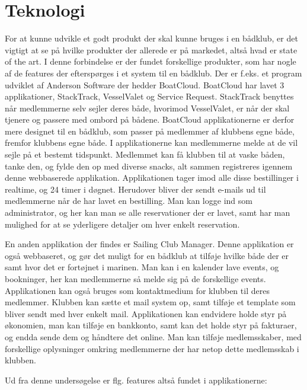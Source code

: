 \chapter{Teknologi}\label{chap:teknologi-analyse}

\cbstart

For at kunne udvikle et godt produkt der skal kunne bruges i en bådklub, er det vigtigt at se på hvilke
produkter der allerede er på markedet, altså hvad er state of the art. I denne forbindelse er der fundet
forskellige produkter, som har nogle af de features der efterspørges i et system til en bådklub. Der er f.eks.
et program udviklet af Anderson Software der hedder BoatCloud.\citep{BoatCloud} BoatCloud har lavet 3
applikationer, StackTrack, VesselValet og Service Request. StackTrack benyttes når medlemmerne selv sejler
deres både, hvorimod VesselValet, er når der skal tjenere og passere med ombord på bådene. BoatCloud
applikationerne er derfor mere designet til en bådklub, som passer på medlemmer af klubbens egne både, fremfor
klubbens egne både. I applikationerne kan medlemmerne melde at de vil sejle på et bestemt tidspunkt. Medlemmet
kan få klubben til at vaske båden, tanke den, og fylde den op med diverse snacks, alt sammen registreres
igennem denne webbaserede applikation. Applikationen tager imod alle disse bestillinger i realtime, og 24
timer i døgnet. Herudover bliver der sendt e-mails ud til medlemmerne når de har lavet en bestilling. Man kan
logge ind som administrator, og her kan man se alle reservationer der er lavet, samt har man mulighed for at
se yderligere detaljer om hver enkelt reservation.

En anden applikation der findes er Sailing Club Manager. \citep{SailClub} Denne applikation er også
webbaseret, og gør det muligt for en bådklub at tilføje hvilke både der er samt hvor det er fortøjnet i
marinen. Man kan i en kalender lave events, og bookninger, her kan medlemmerne så melde sig på de forskellige
events. Applikationen kan også bruges som kontaktmedium for klubben til deres medlemmer. Klubben kan sætte et
mail system op, samt tilføje et template som bliver sendt med hver enkelt mail. Applikationen kan endvidere
holde styr på økonomien, man kan tilføje en bankkonto, samt kan det holde styr på fakturaer, og endda sende
dem og håndtere det online. Man kan tilføje medlemsskaber, med forskellige oplysninger omkring medlemmerne der
har netop dette medlemsskab i klubben.

Ud fra denne undersøgelse er flg. features altså fundet i applikationerne:

